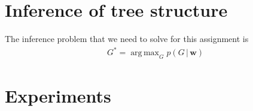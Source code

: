 \documentclass[11pt]{article}
\newcommand{\fig}[1]{Figure~\ref{fig:#1}}
\newcommand{\figlabel}[1]{\label{fig:#1}}
\newcommand{\etal}{\emph{et al.}}
\newcommand{\bvec}[1]{\ensuremath{\boldsymbol{#1}}}
\DeclareMathOperator*{\argmax}{arg\,max}
\begin{document}
\section{Inference of tree structure}

The inference problem that we need to solve for this assignment is
\begin{eqnarray}
    G^* = \argmax_{G} p (G\,|\,\bvec{w})
\end{eqnarray}

\section{Experiments}

%
%
%
\end{document}
